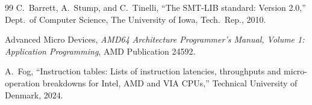 \documentclass[journal,10pt]{IEEEtran}
\begin{document}
\begin{thebibliography}{99}
C.~Barrett, A.~Stump, and C.~Tinelli, ``The SMT-LIB standard:
Version 2.0,'' Dept.\ of Computer Science, The University of Iowa,
Tech.\ Rep., 2010.

Advanced Micro Devices, \emph{AMD64 Architecture Programmer's
Manual, Volume 1: Application Programming}, AMD Publication 24592.

A.~Fog, ``Instruction tables: Lists of instruction latencies,
throughputs and micro-operation breakdowns for Intel, AMD and VIA
CPUs,'' Technical University of Denmark, 2024.

\end{thebibliography}
\end{document}
